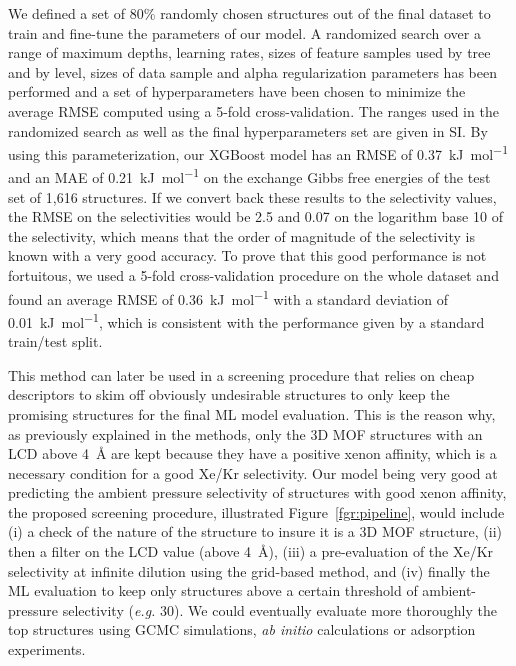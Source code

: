 \documentclass[main]{subfiles}
\begin{document}
We defined a set of {80\%} randomly chosen structures out of the final dataset to train and fine-tune the parameters of our model. A randomized search over a range of maximum depths, learning rates, sizes of feature samples used by tree and by level, sizes of data sample and alpha regularization parameters has been performed and a set of hyperparameters have been chosen to minimize the average RMSE computed using a 5-fold cross-validation. The ranges used in the randomized search as well as the final hyperparameters set are given in SI. By using this parameterization, our XGBoost model has an RMSE of \SI{0.37}{\kilo\joule\per\mole} and an MAE of \SI{0.21}{\kilo\joule\per\mole} on the exchange Gibbs free energies of the test set of 1,616 structures. If we convert back these results to the selectivity values, the RMSE on the selectivities would be 2.5 and 0.07 on the logarithm base 10 of the selectivity, which means that the order of magnitude of the selectivity is known with a very good accuracy. To prove that this good performance is not fortuitous, we used a 5-fold cross-validation procedure on the whole dataset and found an average RMSE of \SI{0.36}{\kilo\joule\per\mole} with a standard deviation of \SI{0.01}{\kilo\joule\per\mole}, which is consistent with the performance given by a standard train/test split.

This method can later be used in a screening procedure that relies on cheap descriptors to skim off obviously undesirable structures to only keep the promising structures for the final ML model evaluation. This is the reason why, as previously explained in the methods, only the 3D MOF structures with an LCD above \SI{4}{\angstrom} are kept because they have a positive xenon affinity, which is a necessary condition for a good Xe/Kr selectivity. Our model being very good at predicting the ambient pressure selectivity of structures with good xenon affinity, the proposed screening procedure, illustrated Figure~\ref{fgr:pipeline}, would include (i) a check of the nature of the structure to insure it is a 3D MOF structure, (ii) then a filter on the LCD value (above \SI{4}{\angstrom}), (iii) a pre-evaluation of the Xe/Kr selectivity at infinite dilution using the grid-based method, and (iv) finally the ML evaluation to keep only structures above a certain threshold of ambient-pressure selectivity (\emph{e.g.} 30). We could eventually evaluate more thoroughly the top structures using GCMC simulations, \emph{ab initio} calculations or adsorption experiments.
\end{document}

